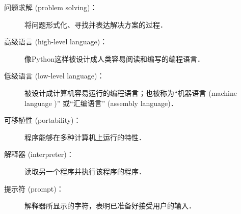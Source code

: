 \begin{description}


\item[问题求解 (problem solving)：]  将问题形式化、寻找并表达解决方案的过程．
  


\item[高级语言 (high-level language)：]  像Python这样被设计成人类容易阅读和编写的编程语言．
  


\item[低级语言 (low-level language)：]  被设计成计算机容易运行的编程语言；也被称为``机器语言 (machine language )'' 或``汇编语言'' (assembly language)．
  


\item[可移植性 (portability)：]  程序能够在多种计算机上运行的特性．
  


\item[解释器 (interpreter)：]  读取另一个程序并执行该程序的程序．
  


\item[提示符 (prompt)：] 解释器所显示的字符，表明已准备好接受用户的输入．
  


\end{description}
